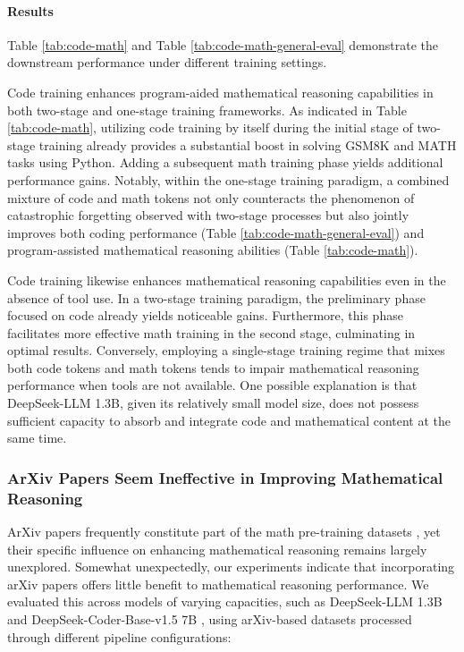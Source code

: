 \begin{itemize}[topsep=0pt]
\begin{itemize}[topsep=0pt]
\paragraph{Results}
Table \ref{tab:code-math} and Table \ref{tab:code-math-general-eval} demonstrate the downstream performance under different training settings.

Code training enhances program-aided mathematical reasoning capabilities in both two-stage and one-stage training frameworks. As indicated in Table \ref{tab:code-math}, utilizing code training by itself during the initial stage of two-stage training already provides a substantial boost in solving GSM8K and MATH tasks using Python. Adding a subsequent math training phase yields additional performance gains. Notably, within the one-stage training paradigm, a combined mixture of code and math tokens not only counteracts the phenomenon of catastrophic forgetting observed with two-stage processes but also jointly improves both coding performance (Table \ref{tab:code-math-general-eval}) and program-assisted mathematical reasoning abilities (Table \ref{tab:code-math}).

Code training likewise enhances mathematical reasoning capabilities even in the absence of tool use. In a two-stage training paradigm, the preliminary phase focused on code already yields noticeable gains. Furthermore, this phase facilitates more effective math training in the second stage, culminating in optimal results. Conversely, employing a single-stage training regime that mixes both code tokens and math tokens tends to impair mathematical reasoning performance when tools are not available. One possible explanation is that DeepSeek-LLM 1.3B, given its relatively small model size, does not possess sufficient capacity to absorb and integrate code and mathematical content at the same time.

\subsubsection{ArXiv Papers Seem Ineffective in Improving Mathematical Reasoning}

ArXiv papers frequently constitute part of the math pre-training datasets \citep{minerva,gpt-f,llemma,mathpile}, yet their specific influence on enhancing mathematical reasoning remains largely unexplored. Somewhat unexpectedly, our experiments indicate that incorporating arXiv papers offers little benefit to mathematical reasoning performance. We evaluated this across models of varying capacities, such as DeepSeek-LLM 1.3B and DeepSeek-Coder-Base-v1.5 7B \citep{deepseek-coder}, using arXiv-based datasets processed through different pipeline configurations:


\end{itemize}
\end{itemize}
